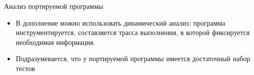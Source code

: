 \documentclass[12pt]{beamer}
\begin{document}
{
\begin{frame}{Анализ портируемой программы}
	\begin{mybox}[]
	\begin{itemize}
	\item В дополнение можно использовать динамический анализ: программа инструментируется, составляется трасса выполнения, в которой фиксируется необходимая информация.
	\item Подразумевается, что у портируемой программы имеется достаточный набор тестов
	\end{itemize}
	\end{mybox}
\end{frame}
}
\end{document}
